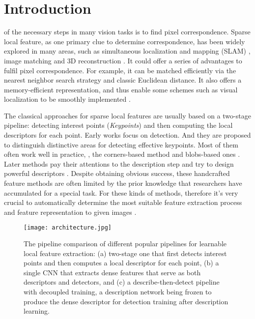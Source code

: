 \documentclass[journal]{IEEEtran}
\begin{document}
\section{Introduction}



 of the necessary steps in many vision tasks is to find pixel correspondence. Sparse local feature, as one primary clue to determine correspondence, has been widely explored in many areas, such as simultaneous localization and mapping (SLAM) \cite{9261135,9531062,9173732}, image matching \cite{9527141,9447920} and 3D reconstruction \cite{9817616,6359953,8962030}. It could offer a series of advantages to fulfil pixel correspondence. For example, it can be matched efficiently via the nearest neighbor search strategy and classic Euclidean distance. It also offers a memory-efficient representation, and thus enable some schemes such as visual localization to be smoothly implemented \cite{D2net}.

The classical approaches for sparse local features are usually based on a two-stage pipeline: detecting interest points (\emph{Keypoints}) and then computing the local descriptors for each point. Early works \cite{hcrt:21,BRISK} focus on detection. And they are proposed to distinguish distinctive areas for detecting effective keypoints. Most of them often work well in practice, , the corners-based method \cite{Harris1988ACC} and blobs-based ones \cite{hcrt:21,hcrt:28}. Later methods pay their attentions to the description step and try to design powerful descriptors \cite{SURF,ORB,BRIEF}. Despite obtaining obvious success, these handcrafted feature methods are often limited by the prior knowledge that researchers have accumulated for a special task. For these kinds of methods, therefore it's very crucial to automatically determine the most suitable feature extraction process and feature representation to given images \cite{R2D2}.

\begin{figure}[t]
\centering
\texttt{[image: architecture.jpg]}
\caption{The pipeline comparison of different popular pipelines for learnable local feature extraction: (a) two-stage one that first detects interest points and then computes a local descriptor for each point, (b) a single CNN that extracts dense features that serve as both descriptors and detectors, and  (c) a describe-then-detect pipeline with decoupled training, a description network being frozen to produce the dense descriptor for detection training after description learning.}
\label{fig1}
\end{figure}
\end{document}
